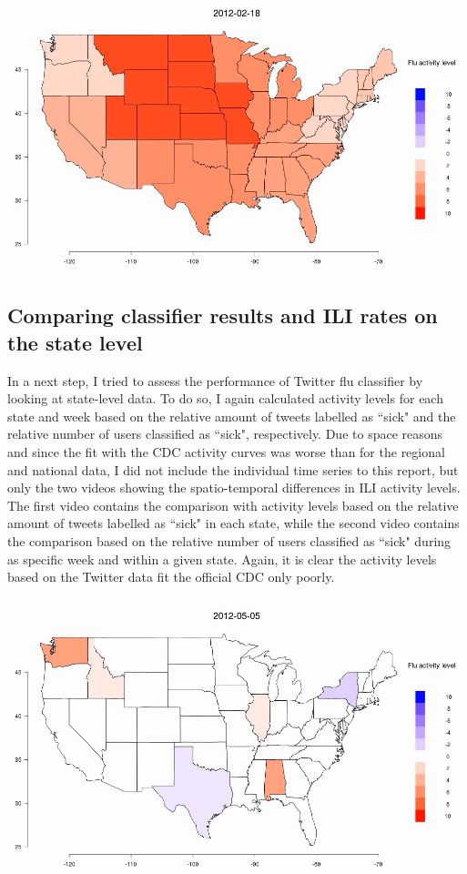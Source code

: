 \documentclass[11pt, a4paper,twoside]{report}\usepackage[]{graphicx}\usepackage[]{color}
\begin{document}
\begin{center}
\href{run:vids/regional_Twitter_cdc_diff_full_rel_sick_user.avi}{\includegraphics[scale=0.5]{vids/Screenshot_Movie.png}}
\end{center}

\subsection{Comparing classifier results and ILI rates on the state level}
\label{sec:comp_cdc_state}
In a next step, I tried to assess the performance of Twitter flu classifier by looking at state-level data. To do so, I again calculated activity levels for each state and week based on the relative amount of tweets labelled as ``sick" and the relative number of users classified as ``sick", respectively. Due to space reasons and since the fit with the CDC activity curves was worse than for the regional and national data, I did not include the individual time series to this report, but only the two videos showing the spatio-temporal differences in ILI activity levels. The first video contains the comparison with activity levels based on the relative amount of tweets labelled as ``sick" in each state, while the second video contains the comparison based on the relative number of users classified as ``sick" during as specific week and within a given state. Again, it is clear the activity levels based on the Twitter data fit the official CDC only poorly.

\begin{center}
\href{run:vids/state_Twitter_cdc_diff_full_rel_sick.avi}{\includegraphics[scale=0.5]{vids/ScreenshotState.png}}
\end{center}
\end{document}
